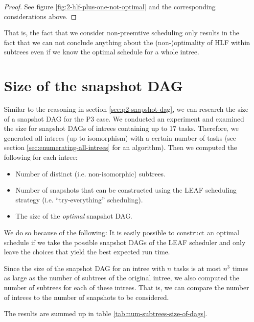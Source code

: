 \begin{proof}
  See figure \ref{fig:2-hlf-plus-one-not-optimal} and the corresponding considerations above.
\end{proof}

That is, the fact that we consider non-preemtive scheduling only results in the fact that we can not conclude anything about the (non-)optimality of HLF within subtrees even if we know the optimal schedule for a whole intree.

\section{Size of the snapshot DAG}
\label{sec:p3-size-of-snapshot-dag-first-attempts}

Similar to the reasoning in section \ref{sec:p2-snapshot-dag}, we can research the size of a snapshot DAG for the P3 case. 
We conducted an experiment and examined the size for snapshot DAGs of intrees containing up to 17 tasks. 
Therefore, we generated all intrees (up to isomorphism) with a certain number of tasks (see section \ref{sec:enumerating-all-intrees} for an algorithm).
Then we computed the following for each intree:
\begin{itemize}
\item Number of distinct (i.e. non-isomorphic) subtrees.
\item Number of snapshots that can be constructed using the LEAF scheduling strategy (i.e. ``try-everything'' scheduling).
\item The size of the \emph{optimal} snapshot DAG.
\end{itemize}

We do so because of the following: It is easily possible to construct an optimal schedule if we take the possible snapshot DAGs of the LEAF scheduler and only leave the choices that yield the best expected run time.

Since the size of the snapshot DAG for an intree with $n$ tasks is at most $n^3$ times as large as the number of subtrees of the original intree, we also computed the number of subtrees for each of these intrees.
That is, we can compare the number of intrees to the number of snapshots to be considered.

The results are summed up in table \ref{tab:num-subtrees-size-of-dags}.


